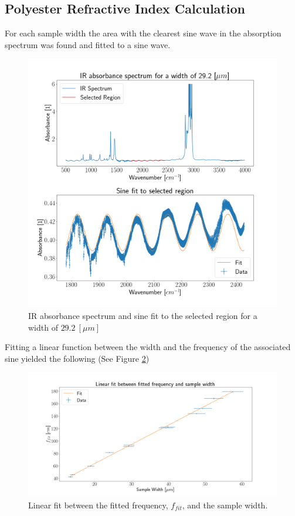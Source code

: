 \documentclass[reprint,amsmath,amssymb,aps, prl]{revtex4-2}
\begin{document}
\subsection{Polyester Refractive Index Calculation}
For each sample width the area with the clearest sine wave in the absorption spectrum was found and fitted to a sine wave.
\begin{figure}[h]
    
    \includegraphics[width=\linewidth]{Images/29_2_Spec.png}
    \caption{IR absorbance spectrum and sine fit to the selected region for a width of $29.2\ [\mu m]$}
    \label{fig:SineFitEx}
    \centering
\end{figure}
Fitting a linear function between the width and the frequency of the associated sine yielded the following (See Figure \ref{fig:ThinLinWidthFreq})
\begin{figure}[h]
    \includegraphics[width=\linewidth]{Images/__linear_fit.png}
    \caption{Linear fit between the fitted frequency, $f_{fit}$, and the sample width.}
    \label{fig:ThinLinWidthFreq}
    \centering
\end{figure}
\end{document}
